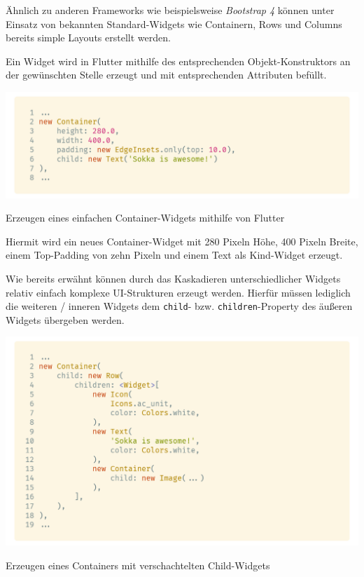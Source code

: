 Ähnlich zu anderen Frameworks wie beispielsweise \textit{Bootstrap 4} können unter Einsatz von bekannten Standard-Widgets wie Containern, Rows und Columns bereits simple Layouts erstellt werden.

\newpage

Ein Widget wird in Flutter mithilfe des entsprechenden Objekt-Konstruktors an der gewünschten Stelle erzeugt und mit entsprechenden Attributen befüllt.

\begin{code}
    \centering
    \includegraphics[width=1\textwidth]{images/Flutter/flutterCreateContainer.png}
    \vspace{-25pt}
    \caption{Erzeugen eines einfachen Container-Widgets mithilfe von Flutter}
\end{code}

Hiermit wird ein neues Container-Widget mit 280 Pixeln Höhe,
400 Pixeln Breite, einem Top-Padding von zehn Pixeln und einem Text als Kind-Widget erzeugt.

Wie bereits erwähnt können durch das Kaskadieren unterschiedlicher Widgets relativ einfach komplexe UI-Strukturen erzeugt werden. Hierfür müssen lediglich die weiteren / inneren Widgets dem \lstinline{child}- bzw. \lstinline{children}-Property des äußeren Widgets übergeben werden.

\begin{code}
    \centering
    \includegraphics[width=1\textwidth]{images/Flutter/flutterCreateCascadingContainer.png}
    \vspace{-25pt}
    \caption{Erzeugen eines Containers mit verschachtelten Child-Widgets}
\end{code}

